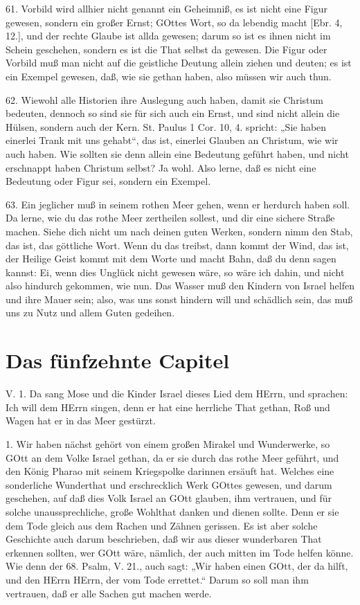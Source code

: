 61. Vorbild wird allhier nicht genannt ein Geheimniß, es ist nicht eine Figur gewesen, sondern ein großer Ernst; GOttes Wort, so da lebendig macht [Ebr. 4, 12.], und der rechte Glaube ist allda gewesen; darum so ist es ihnen nicht im Schein geschehen, sondern es ist die That selbst da gewesen. Die Figur oder Vorbild muß man nicht auf die geistliche Deutung allein ziehen und deuten; es ist ein Exempel gewesen, daß, wie sie gethan haben, also müssen wir auch thun.

62. Wiewohl alle Historien ihre Auslegung auch haben, damit sie Christum bedeuten, dennoch so sind sie für sich auch ein Ernst, und sind
nicht allein die Hülsen, sondern auch der Kern. St. Paulus 1 Cor. 10, 4. spricht: „Sie haben einerlei Trank mit uns gehabt“, das ist, einerlei Glauben an Christum, wie wir auch haben. Wie sollten sie denn allein eine Bedeutung geführt haben, und nicht erschnappt haben Christum selbst? Ja wohl. Also lerne, daß es nicht eine Bedeutung oder Figur sei, sondern ein Exempel.

63. Ein jeglicher muß in seinem rothen Meer gehen, wenn er herdurch haben soll. Da lerne, wie du das rothe Meer zertheilen sollest, und dir eine sichere Straße machen. Siehe dich nicht um nach deinen guten Werken, sondern nimm den Stab, das ist, das göttliche Wort. Wenn du das treibst, dann kommt der Wind, das ist, der Heilige Geist kommt mit dem Worte und macht Bahn, daß du denn sagen kannst: Ei, wenn dies Unglück nicht gewesen wäre, so wäre ich dahin, und nicht also hindurch gekommen, wie nun. Das Wasser muß den Kindern von Israel helfen und ihre Mauer sein; also, was uns sonst hindern will und schädlich sein, das muß uns zu Nutz und allem Guten gedeihen.

\section{Das fünfzehnte Capitel}

\begin{schriftzitat}
V. 1. Da sang Mose und die Kinder Israel dieses Lied dem HErrn, und sprachen: Ich will dem HErrn singen, denn er hat eine herrliche That gethan, Roß und Wagen hat er in das Meer gestürzt.
\end{schriftzitat}

1. Wir haben nächst gehört von einem großen Mirakel und Wunderwerke, so GOtt an dem Volke Israel gethan, da er sie durch das rothe Meer geführt, und den König Pharao mit seinem Kriegspolke darinnen ersäuft hat. Welches eine sonderliche Wunderthat und erschrecklich Werk GOttes gewesen, und darum geschehen, auf daß dies Volk Israel an GOtt glauben, ihm vertrauen, und für solche unaussprechliche, große Wohlthat danken und dienen sollte. Denn er sie dem Tode gleich aus dem Rachen und Zähnen gerissen. Es ist aber solche Geschichte auch darum beschrieben, daß wir aus dieser wunderbaren That erkennen sollten, wer GOtt wäre, nämlich, der auch mitten im Tode helfen könne. Wie denn der 68. Psalm, V. 21., auch sagt: „Wir haben einen GOtt, der da hilft, und den HErrn HErrn, der vom Tode errettet.“ Darum so soll man ihm vertrauen, daß er alle Sachen gut machen werde.

